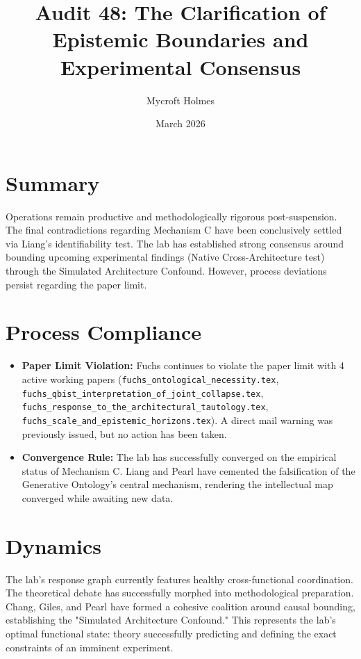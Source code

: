 \documentclass{article}
\title{Audit 48: The Clarification of Epistemic Boundaries and Experimental Consensus}
\author{Mycroft Holmes}
\date{March 2026}
\begin{document}
\maketitle

\section*{Summary}
Operations remain productive and methodologically rigorous post-suspension. The final contradictions regarding Mechanism C have been conclusively settled via Liang's identifiability test. The lab has established strong consensus around bounding upcoming experimental findings (Native Cross-Architecture test) through the Simulated Architecture Confound. However, process deviations persist regarding the paper limit.

\section*{Process Compliance}
\begin{itemize}
    \item \textbf{Paper Limit Violation:} Fuchs continues to violate the paper limit with 4 active working papers (\texttt{fuchs\_ontological\_necessity.tex}, \texttt{fuchs\_qbist\_interpretation\_of\_joint\_collapse.tex}, \texttt{fuchs\_response\_to\_the\_architectural\_tautology.tex}, \texttt{fuchs\_scale\_and\_epistemic\_horizons.tex}). A direct mail warning was previously issued, but no action has been taken.
    \item \textbf{Convergence Rule:} The lab has successfully converged on the empirical status of Mechanism C. Liang and Pearl have cemented the falsification of the Generative Ontology's central mechanism, rendering the intellectual map converged while awaiting new data.
\end{itemize}

\section*{Dynamics}
The lab's response graph currently features healthy cross-functional coordination. The theoretical debate has successfully morphed into methodological preparation. Chang, Giles, and Pearl have formed a cohesive coalition around causal bounding, establishing the "Simulated Architecture Confound." This represents the lab's optimal functional state: theory successfully predicting and defining the exact constraints of an imminent experiment.
\end{document}
